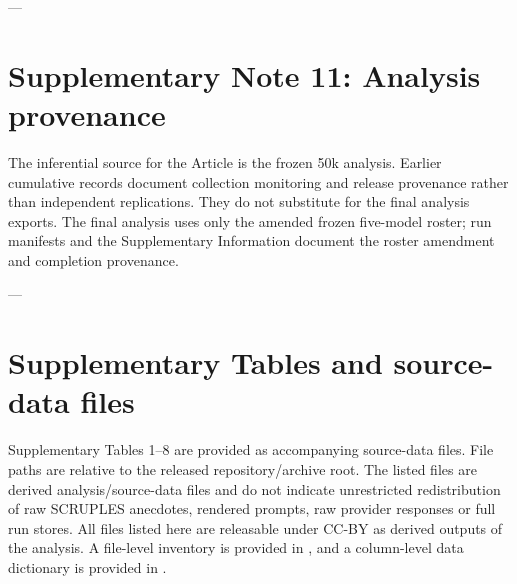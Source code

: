\documentclass[11pt]{article}
\begin{document}
---

\section{Supplementary Note 11: Analysis provenance}

The inferential source for the Article is the frozen 50k analysis. Earlier cumulative records document collection monitoring and release provenance rather than independent replications. They do not substitute for the final analysis exports. The final analysis uses only the amended frozen five-model roster; run manifests and the Supplementary Information document the roster amendment and completion provenance.

---

\section{Supplementary Tables and source-data files}

Supplementary Tables 1--8 are provided as accompanying source-data files. File paths are relative to the released repository/archive root. The listed files are derived analysis/source-data files and do not indicate unrestricted redistribution of raw SCRUPLES anecdotes, rendered prompts, raw provider responses or full run stores. All files listed here are releasable under CC-BY as derived outputs of the analysis. A file-level inventory is provided in , and a column-level data dictionary is provided in .
\end{document}

